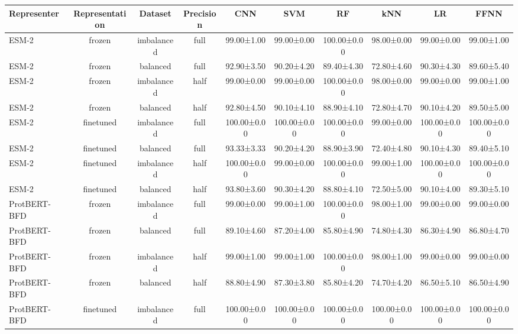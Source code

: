 \begin{tabular}{lccccccccc}
\toprule
 \textbf{Representer} & \textbf{Representation} &    \textbf{Dataset} & \textbf{Precision} &         \textbf{CNN} &         \textbf{SVM} &          \textbf{RF} &         \textbf{kNN} &          \textbf{LR} &        \textbf{FFNN} \\
\midrule
       ESM-2 &         frozen & imbalanced &      full &  99.00±1.00 &  99.00±0.00 & 100.00±0.00 &  98.00±0.00 &  99.00±0.00 &  99.00±1.00 \\
       ESM-2 &         frozen &   balanced &      full &  92.90±3.50 &  90.20±4.20 &  89.40±4.30 &  72.80±4.60 &  90.30±4.30 &  89.60±5.40 \\
       ESM-2 &         frozen & imbalanced &      half &  99.00±0.00 &  99.00±0.00 & 100.00±0.00 &  98.00±0.00 &  99.00±0.00 &  99.00±1.00 \\
       ESM-2 &         frozen &   balanced &      half &  92.80±4.50 &  90.10±4.10 &  88.90±4.10 &  72.80±4.70 &  90.10±4.20 &  89.50±5.00 \\
       ESM-2 &      finetuned & imbalanced &      full & 100.00±0.00 & 100.00±0.00 & 100.00±0.00 &  99.00±0.00 & 100.00±0.00 & 100.00±0.00 \\
       ESM-2 &      finetuned &   balanced &      full &  93.33±3.33 &  90.20±4.20 &  88.90±3.90 &  72.40±4.80 &  90.10±4.30 &  89.40±5.10 \\
       ESM-2 &      finetuned & imbalanced &      half & 100.00±0.00 &  99.00±0.00 & 100.00±0.00 &  99.00±1.00 & 100.00±0.00 & 100.00±0.00 \\
       ESM-2 &      finetuned &   balanced &      half &  93.80±3.60 &  90.30±4.20 &  88.80±4.10 &  72.50±5.00 &  90.10±4.00 &  89.30±5.10 \\
ProtBERT-BFD &         frozen & imbalanced &      full &  99.00±0.00 &  99.00±1.00 & 100.00±0.00 &  98.00±1.00 &  99.00±0.00 &  99.00±0.00 \\
ProtBERT-BFD &         frozen &   balanced &      full &  89.10±4.60 &  87.20±4.00 &  85.80±4.90 &  74.80±4.30 &  86.30±4.90 &  86.80±4.70 \\
ProtBERT-BFD &         frozen & imbalanced &      half &  99.00±1.00 &  99.00±1.00 & 100.00±0.00 &  98.00±1.00 &  99.00±0.00 &  99.00±0.00 \\
ProtBERT-BFD &         frozen &   balanced &      half &  88.80±4.90 &  87.30±3.80 &  85.80±4.20 &  74.70±4.20 &  86.50±5.10 &  86.50±4.90 \\
ProtBERT-BFD &      finetuned & imbalanced &      full & 100.00±0.00 & 100.00±0.00 & 100.00±0.00 & 100.00±0.00 & 100.00±0.00 & 100.00±0.00 \\

\end{tabular}
